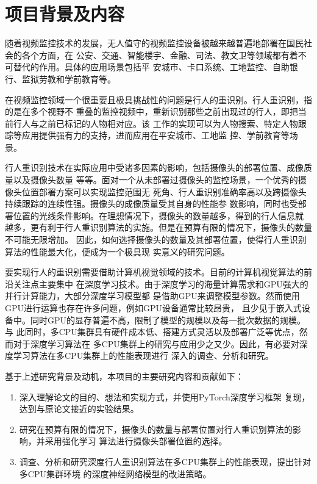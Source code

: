 \section{项目背景及内容}
随着视频监控技术的发展，无人值守的视频监控设备被越来越普遍地部署在国民社会的各个方面，在
公安、交通、智能楼宇、金融、司法、教文卫等领域都有着不可替代的作用。具体的应用场景包括平
安城市、卡口系统、工地监控、自助银行、监狱劳教和学前教育等。

在视频监控领域一个很重要且极具挑战性的问题是行人的重识别。行人重识别，指的是在多个视野不
重叠的监控视频中，重新识别那些之前出现过的行人，即把当前行人与之前已标记的人物相对应。该
工作的实现可以为人物搜索、特定人物跟踪等应用提供强有力的支持，进而应用在平安城市、工地监
控、学前教育等场景。

行人重识别技术在实际应用中受诸多因素的影响，包括摄像头的部署位置、成像质量以及摄像头数量
等等。面对一个从未部署过摄像头的监控场景，一个优秀的摄像头位置部署方案可以实现监控范围无
死角、行人重识别准确率高以及跨摄像头持续跟踪的连续性强。摄像头的成像质量受其自身的性能参
数影响，同时也受部署位置的光线条件影响。在理想情况下，摄像头的数量越多，得到的行人信息就
越多，更有利于行人重识别算法的实施。但是在预算有限的情况下，摄像头的数量不可能无限增加。
因此，如何选择摄像头的数量及其部署位置，使得行人重识别算法的性能最大化，便成为一个极具现
实意义的研究问题。

要实现行人的重识别需要借助计算机视觉领域的技术。目前的计算机视觉算法的前沿关注点主要集中
在深度学习技术。由于深度学习的海量计算需求和GPU强大的并行计算能力，大部分深度学习模型都
是借助GPU来调整模型参数。然而使用GPU进行运算也存在许多问题，例如GPU设备通常比较昂贵，
且少见于嵌入式设备中。同时GPU的显存普遍不高，限制了模型的规模以及每一批次数据的规模。与
此同时，多CPU集群具有硬件成本低、搭建方式灵活以及部署广泛等优点，然而对于深度学习算法在
多CPU集群上的研究与应用少之又少。因此，有必要对深度学习算法在多CPU集群上的性能表现进行
深入的调查、分析和研究。

基于上述研究背景及动机，本项目的主要研究内容和贡献如下：

\begin{enumerate}
\item 深入理解论文\cite{sun2017beyond}的目的、想法和实现方式，并使用PyTorch深度学习框架
复现，达到与原论文接近的实验结果。
\item 研究在预算有限的情况下，摄像头的数量与部署位置对行人重识别算法的影响，并采用强化学习
算法进行摄像头部署位置的选择。
\item 调查、分析和研究深度行人重识别算法在多CPU集群上的性能表现，提出针对多CPU集群环境
的深度神经网络模型的改进策略。
\end{enumerate}

